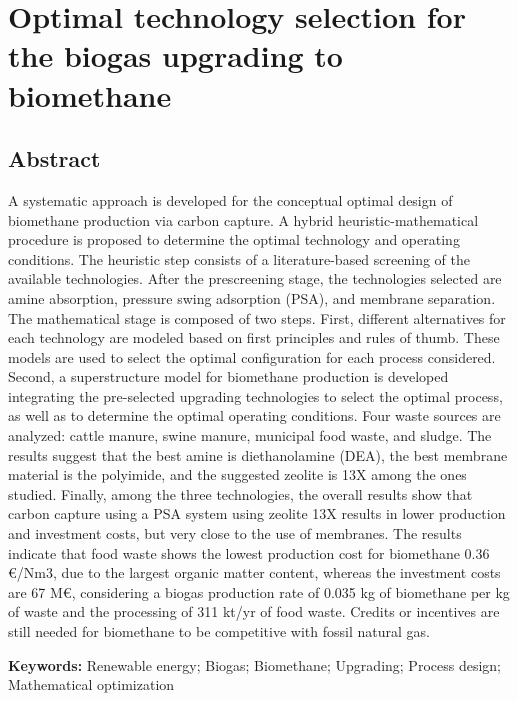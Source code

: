 \chapter{Optimal technology selection for the biogas upgrading to biomethane}\label{ch:BiogasUpgrading}
\begin{refsection}[referencesCh7]
\section*{Abstract}
A systematic approach is developed for the conceptual optimal design of biomethane production via carbon capture. A hybrid heuristic-mathematical procedure is proposed to determine the optimal technology and operating conditions. The heuristic step consists of a literature-based screening of the available technologies. After the prescreening stage, the technologies selected are amine absorption, pressure swing adsorption (PSA), and membrane separation. The mathematical stage is composed of two steps. First, different alternatives for each technology are modeled based on first principles and rules of thumb. These models are used to select the optimal configuration for each process considered. Second, a superstructure model for biomethane production is developed integrating the pre-selected upgrading technologies to select the optimal process, as well as to determine the optimal operating conditions. Four waste sources are analyzed: cattle manure, swine manure, municipal food waste, and sludge. The results suggest that the best amine is diethanolamine (DEA), the best membrane material is the polyimide, and the suggested zeolite is 13X among the ones studied. Finally, among the three technologies, the overall results show that carbon capture using a PSA system using zeolite 13X results in lower production and investment costs, but very close to the use of membranes. The results indicate that food waste shows the lowest production cost for biomethane 0.36 €/Nm3, due to the largest organic matter content, whereas the investment costs are 67 M€, considering a biogas production rate of 0.035 kg of biomethane per kg of waste and the processing of 311 kt/yr of food waste. Credits or incentives are still needed for biomethane to be competitive with fossil natural gas.

\bigskip
\textbf{Keywords:} Renewable energy; Biogas; Biomethane; Upgrading; Process design; Mathematical optimization
\newpage


\end{refsection}
